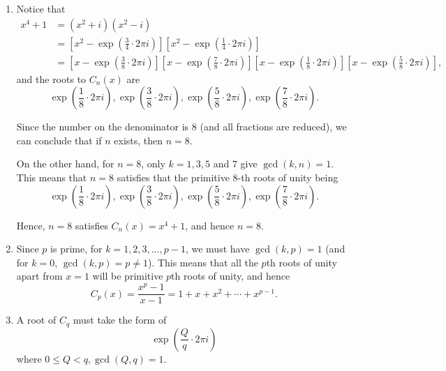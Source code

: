 \begin{enumerate}
    \item Notice that
          \begin{align*}
              x^4 + 1 & = (x^2 + i) (x^2 - i)                                                                                                                                                                                                                              \\
                      & = \left[x^2 - \exp\left(\frac{3}{4} \cdot 2 \pi i\right)\right] \left[x^2 - \exp\left(\frac{1}{4} \cdot 2 \pi i\right)\right]                                                                                                                      \\
                      & = \left[x - \exp\left(\frac{3}{8} \cdot 2 \pi i\right)\right] \left[x - \exp\left(\frac{7}{8} \cdot 2 \pi i\right)\right] \left[x - \exp\left(\frac{1}{8} \cdot 2 \pi i\right)\right] \left[x - \exp\left(\frac{5}{8} \cdot 2 \pi i\right)\right],
          \end{align*}
          and the roots to \(C_n(x)\) are
          \[
              \exp\left(\frac{1}{8} \cdot 2 \pi i\right), \exp\left(\frac{3}{8} \cdot 2 \pi i\right), \exp\left(\frac{5}{8} \cdot 2 \pi i\right), \exp\left(\frac{7}{8} \cdot 2 \pi i\right).
          \]

          Since the number on the denominator is \(8\) (and all fractions are reduced), we can conclude that if \(n\) exists, then \(n = 8\).

          On the other hand, for \(n = 8\), only \(k = 1, 3, 5\) and \(7\) give \(\gcd(k, n) = 1\). This means that \(n = 8\) satisfies that the primitive \(8\)-th roots of unity being
          \[
              \exp\left(\frac{1}{8} \cdot 2 \pi i\right), \exp\left(\frac{3}{8} \cdot 2 \pi i\right), \exp\left(\frac{5}{8} \cdot 2 \pi i\right), \exp\left(\frac{7}{8} \cdot 2 \pi i\right).
          \]

          Hence, \(n = 8\) satisfies \(C_n(x) = x^4 + 1\), and hence \(n = 8\).

    \item Since \(p\) is prime, for \(k = 1, 2, 3, \ldots, p - 1\), we must have \(\gcd(k, p) = 1\) (and for \(k = 0\), \(\gcd(k, p) = p \neq 1\)). This means that all the \(p\)th roots of unity apart from \(x = 1\) will be primitive \(p\)th roots of unity, and hence
          \[
              C_p(x) = \frac{x^p - 1}{x - 1} = 1 + x + x^2 + \cdots + x^{p - 1}.
          \]

    \item A root of \(C_q\) must take the form of
          \[
              \exp \left(\frac{Q}{q} \cdot 2\pi i\right)
          \]
          where \(0 \leq Q < q, \gcd(Q, q) = 1\).


\end{enumerate}
